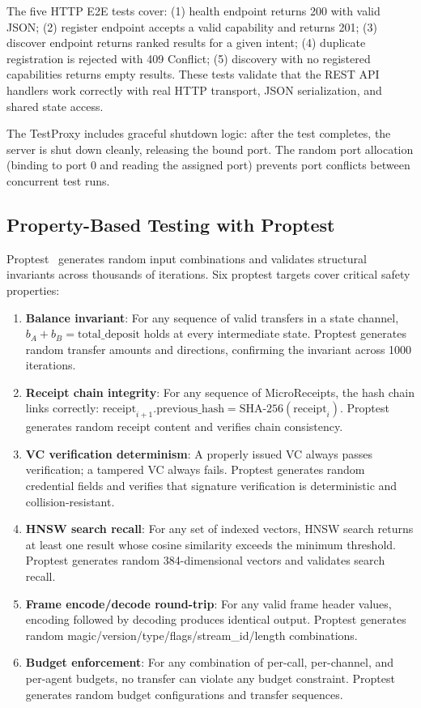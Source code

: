 The five HTTP E2E tests cover: (1) health endpoint returns 200 with valid JSON; (2) register endpoint accepts a valid capability and returns 201; (3) discover endpoint returns ranked results for a given intent; (4) duplicate registration is rejected with 409 Conflict; (5) discovery with no registered capabilities returns empty results. These tests validate that the REST API handlers work correctly with real HTTP transport, JSON serialization, and shared state access.

The TestProxy includes graceful shutdown logic: after the test completes, the server is shut down cleanly, releasing the bound port. The random port allocation (binding to port 0 and reading the assigned port) prevents port conflicts between concurrent test runs.

\subsection{Property-Based Testing with Proptest}

Proptest~\cite{proptest2019} generates random input combinations and validates structural invariants across thousands of iterations. Six proptest targets cover critical safety properties:

\begin{enumerate}
  \item \textbf{Balance invariant}: For any sequence of valid transfers in a state channel, $b_A + b_B = \text{total\_deposit}$ holds at every intermediate state. Proptest generates random transfer amounts and directions, confirming the invariant across 1000 iterations.

  \item \textbf{Receipt chain integrity}: For any sequence of MicroReceipts, the hash chain links correctly: $\text{receipt}_{i+1}.\text{previous\_hash} = \text{SHA-256}(\text{receipt}_i)$. Proptest generates random receipt content and verifies chain consistency.

  \item \textbf{VC verification determinism}: A properly issued VC always passes verification; a tampered VC always fails. Proptest generates random credential fields and verifies that signature verification is deterministic and collision-resistant.

  \item \textbf{HNSW search recall}: For any set of indexed vectors, HNSW search returns at least one result whose cosine similarity exceeds the minimum threshold. Proptest generates random 384-dimensional vectors and validates search recall.

  \item \textbf{Frame encode/decode round-trip}: For any valid frame header values, encoding followed by decoding produces identical output. Proptest generates random magic/version/type/flags/stream\_id/length combinations.

  \item \textbf{Budget enforcement}: For any combination of per-call, per-channel, and per-agent budgets, no transfer can violate any budget constraint. Proptest generates random budget configurations and transfer sequences.
\end{enumerate}

